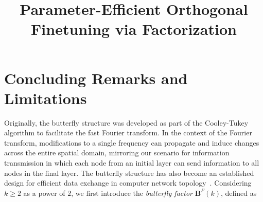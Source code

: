 \title{Parameter-Efficient Orthogonal Finetuning via Factorization}
\section{Concluding Remarks and Limitations}

Originally, the butterfly structure was developed as part of the Cooley-Tukey algorithm to facilitate the fast Fourier transform. In the context of the Fourier transform, modifications to a single frequency can propagate and induce changes across the entire spatial domain, mirroring our scenario for information transmission in which each node from an initial layer can send information to all nodes in the final layer. The butterfly structure has also become an established design for efficient data exchange in computer network topology~\cite{solihin2015fundamentals,li2011linear}. Considering $k \geq 2$ as a power of $2$, we first introduce the \emph{butterfly factor} $\bm{B}^F(k)$, defined as


